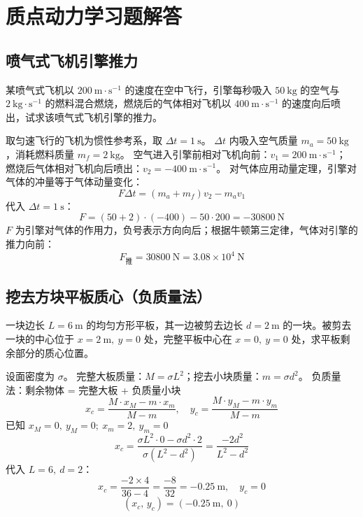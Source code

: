 \section{质点动力学习题解答}
\subsection{喷气式飞机引擎推力}
某喷气式飞机以 $200\ \mathrm{m\cdot s^{-1}}$ 的速度在空中飞行，引擎每秒吸入 $50\ \mathrm{kg}$ 的空气与 $2\ \mathrm{kg\cdot s^{-1}}$ 的燃料混合燃烧，燃烧后的气体相对飞机以 $400\ \mathrm{m\cdot s^{-1}}$ 的速度向后喷出，试求该喷气式飞机引擎的推力。
\begin{solution}
取匀速飞行的飞机为惯性参考系，取 $\Delta t=1\ \mathrm{s}$。
$\Delta t$ 内吸入空气质量 $m_a=50\ \mathrm{kg}$，消耗燃料质量 $m_f=2\ \mathrm{kg}$。
空气进入引擎前相对飞机向前：$v_1=200\ \mathrm{m\cdot s^{-1}}$；
燃烧后气体相对飞机向后喷出：$v_2=-400\ \mathrm{m\cdot s^{-1}}$。
对气体应用动量定理，引擎对气体的冲量等于气体动量变化：
\[
F \Delta t = (m_a+m_f)v_2 - m_a v_1
\]
代入 $\Delta t=1\ \mathrm{s}$：
\[
F = (50+2)\cdot(-400) - 50 \cdot 200 = -30800\ \mathrm{N}
\]
$F$ 为引擎对气体的作用力，负号表示方向向后；根据牛顿第三定律，气体对引擎的推力向前：
\[
\boxed{F_\text{推}=30800\ \mathrm{N}=3.08\times 10^4\ \mathrm{N}}
\]
\end{solution}
\subsection{挖去方块平板质心（负质量法）}
一块边长 $L=6\ \mathrm{m}$ 的均匀方形平板，其一边被剪去边长 $d=2\ \mathrm{m}$ 的一块。被剪去一块的中心位于 $x=2\ \mathrm{m},\ y=0$ 处，完整平板中心在 $x=0,\ y=0$ 处，求平板剩余部分的质心位置。
\begin{solution}
设面密度为 $\sigma$。
完整大板质量：$M=\sigma L^2$；挖去小块质量：$m=\sigma d^2$。
负质量法：剩余物体 = 完整大板 + 负质量小块
\[
x_c = \frac{M\cdot x_M - m\cdot x_m}{M-m},\quad y_c = \frac{M\cdot y_M - m\cdot y_m}{M-m}
\]
已知 $x_M=0,\ y_M=0;\ x_m=2,\ y_m=0$
\[
x_c=\frac{\sigma L^2 \cdot 0 - \sigma d^2 \cdot 2}{\sigma(L^2-d^2)}
=\frac{-2d^2}{L^2-d^2}
\]
代入 $L=6,\ d=2$：
\[
x_c=\frac{-2\times 4}{36-4}=\frac{-8}{32}=-0.25\ \mathrm{m},\quad y_c=0
\]
\[
\boxed{(x_c,\,y_c)=(-0.25\ \mathrm{m},\ 0)}
\]
\end{solution}
